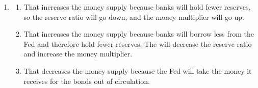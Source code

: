 \documentclass{article}
\begin{document}
\begin{enumerate}
\begin{enumerate}
	\end{enumerate}
	
\item

	\begin{enumerate}
	
	\item That increases the money supply because banks will hold fewer reserves, so the reserve ratio will go down, and the money multiplier will go up.
	
	\item That increases the money supply because banks will borrow less from the Fed and therefore hold fewer reserves. The will decrease the reserve ratio and increase the money multiplier.
	
	\item That decreases the money supply because the Fed will take the money it receives for the bonds out of circulation.
	
	\end{enumerate}

\end{enumerate}
\end{document}
